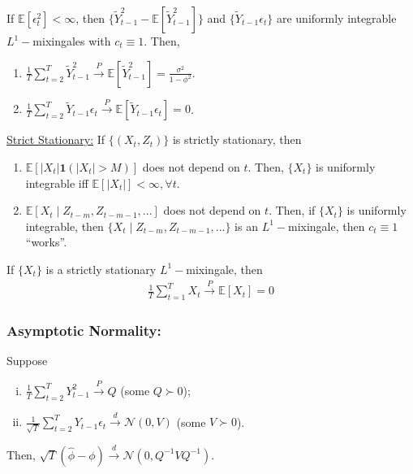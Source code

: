 \documentclass[11pt]{elegantbook}
\begin{document}
\begin{example}[ (AR(1) Example)]
    If $\mathbb{E}[\epsilon_t^2]<\infty$, then $\{\tilde{Y}_{t-1}^2-\mathbb{E}[\tilde{Y}_{t-1}^2]\}$ and $\{\tilde{Y}_{t-1}\epsilon_t\}$ are uniformly integrable $L^1-$mixingales with $c_t\equiv 1$. Then,
    \begin{enumerate}
        \item $\frac{1}{T}\sum_{t=2}^T\tilde{Y}_{t-1}^2 \stackrel{P}{\longrightarrow} \mathbb{E}[\tilde{Y}_{t-1}^2]=\frac{\sigma^2}{1-\phi^2}$.
        \item $\frac{1}{T}\sum_{t=2}^T\tilde{Y}_{t-1}\epsilon_t \stackrel{P}{\longrightarrow} \mathbb{E}[\tilde{Y}_{t-1}\epsilon_t] = 0$.
    \end{enumerate}
    \underline{Strict Stationary:} If $\{(X_t,Z_t)\}$ is strictly stationary, then
    \begin{enumerate}[$\circ$]
        \item $\mathbb{E}\left[|X_t|\mathbf{1}\left(|X_t|>M\right)\right]$ does not depend on $t$. Then, $\{X_t\}$ is uniformly integrable iff $\mathbb{E}\left[|X_t|\right]<\infty,\forall t$.
        \item $\mathbb{E}[X_t\mid Z_{t-m},Z_{t-m-1},...]$ does not depend on $t$. Then, if $\{X_t\}$ is uniformly integrable, then $\{X_t\mid Z_{t-m},Z_{t-m-1},...\}$ is an $L^1-$mixingale, then $c_t\equiv 1$ ``works''.
    \end{enumerate}
\end{example}
\begin{corollary}
    If $\{X_t\}$ is a strictly stationary $L^1-$mixingale, then
    \begin{equation}
        \begin{aligned}
            \frac{1}{T}\sum_{t=1}^T X_t \stackrel{P}{\rightarrow} \mathbb{E}[X_t]=0
        \end{aligned}
        \nonumber
    \end{equation}
\end{corollary}

\subsubsection*{Asymptotic Normality:} Suppose
\begin{enumerate}[(i).]
    \item $\frac{1}{T}\sum_{t=2}^T Y_{t-1}^2 \stackrel{P}{\longrightarrow} Q$ (some $Q\succ 0$);
    \item $\frac{1}{\sqrt{T}}\sum_{t=2}^T Y_{t-1}\epsilon_t \stackrel{d}{\longrightarrow} \mathcal{N}\left(0,V\right)$ (some $V\succ 0$).
\end{enumerate}
Then, $\sqrt{T}\left(\hat{\phi}-\phi\right) \stackrel{d}{\longrightarrow} \mathcal{N}\left(0,Q^{-1}VQ^{-1}\right)$.
\end{document}
